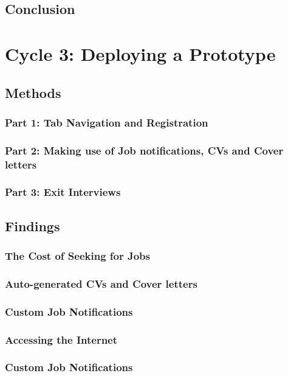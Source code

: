 \documentclass[12pt,a4paper,oneside]{report}
\begin{document}
\section{Conclusion}


\chapter{Cycle 3: Deploying a Prototype}

\section{Methods}
\subsection{Part 1: Tab Navigation and Registration}
\subsection{Part 2: Making use of Job notifications, CVs and Cover letters}
\subsection{Part 3: Exit Interviews}

\section{Findings}
\subsection{The Cost of Seeking for Jobs}
\subsection{Auto-generated CVs and Cover letters}
\subsection{Custom Job Notifications}
\subsection{Accessing the Internet}
\subsection{Custom Job Notifications}
\end{document}
